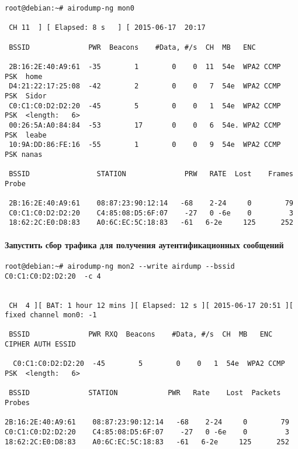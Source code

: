 \documentclass[10pt,a4paper]{article}
\begin{document}
\begin{verbatim}
root@debian:~# airodump-ng mon0
 
 CH 11  ] [ Elapsed: 8 s   ] [ 2015-06-17  20:17
 
 BSSID              PWR  Beacons    #Data, #/s  CH  MB   ENC  
     
 2B:16:2E:40:A9:61  -35        1        0    0  11  54e  WPA2 CCMP   PSK  home  
 D4:21:22:17:25:08  -42        2        0    0   7  54e  WPA2 CCMP   PSK  Sidor 
 C0:C1:C0:D2:D2:20  -45        5        0    0   1  54e  WPA2 CCMP   PSK  <length:   6>  
 00:26:5A:A0:84:84  -53        17       0    0   6  54e. WPA2 CCMP   PSK  leabe 
 10:9A:DD:86:FE:16  -55        1        0    0   9  54e  WPA2 CCMP   PSK nanas
  
 BSSID                STATION              PRW   RATE  Lost    Frames  Probe
 
 2B:16:2E:40:A9:61    08:87:23:90:12:14   -68    2-24     0        79   
 C0:C1:C0:D2:D2:20    C4:85:08:D5:6F:07    -27   0 -6e    0         3   
 18:62:2C:E0:D8:83    A0:6C:EC:5C:18:83   -61   6-2e     125      252
\end{verbatim}

\paragraph{Запустить сбор трафика для получения аутентификационных сообщений}

\begin{verbatim}
root@debian:~# airodump-ng mon2 --write airdump --bssid  C0:C1:C0:D2:D2:20  -c 4


 CH  4 ][ BAT: 1 hour 12 mins ][ Elapsed: 12 s ][ 2015-06-17 20:51 ][ fixed channel mon0: -1    
                                                                                                
 BSSID              PWR RXQ  Beacons    #Data, #/s  CH  MB   ENC  CIPHER AUTH ESSID             
                                                                                                
  C0:C1:C0:D2:D2:20  -45        5        0    0   1  54e  WPA2 CCMP   PSK  <length:   6>                   
                                                                                                
 BSSID              STATION            PWR   Rate    Lost  Packets  Probes                      
                                                                                                
2B:16:2E:40:A9:61    08:87:23:90:12:14   -68    2-24     0        79   
C0:C1:C0:D2:D2:20    C4:85:08:D5:6F:07    -27   0 -6e    0         3
18:62:2C:E0:D8:83    A0:6C:EC:5C:18:83   -61   6-2e     125      252   
 
\end{verbatim}
\end{document}
